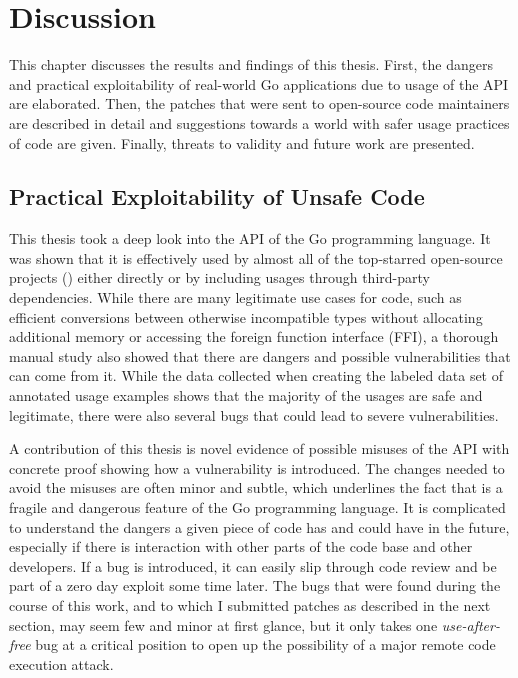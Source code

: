 
\chapter{Discussion}\label{ch:discussion}

This chapter discusses the results and findings of this thesis.
First, the dangers and practical exploitability of real-world Go applications due to usage of the \unsafe{} API are
elaborated.
Then, the patches that were sent to open-source code maintainers  are described in detail and suggestions towards a
world with safer usage practices of \unsafe{} code are given.
Finally, threats to validity and future work are presented.



\section{Practical Exploitability of Unsafe Code}\label{sec:discussion:exploitability}

This thesis took a deep look into the \unsafe{} API of the Go programming language.
It was shown that it is effectively used by almost all of the \projsAnalyzed{} top-starred open-source projects
(\percentageUnsafeTransitiveWithDependencies{}) either directly or by including \unsafe{} usages through third-party
dependencies.
While there are many legitimate use cases for \unsafe{} code, such as efficient conversions between otherwise
incompatible types without allocating additional memory or accessing the foreign function interface (\acrshort{FFI}),
a thorough manual study also showed that there are dangers and possible vulnerabilities that can come from it.
While the data collected when creating the labeled data set of annotated \unsafe{} usage examples shows that the
majority of the usages are safe and legitimate, there were also several bugs that could lead to severe vulnerabilities.

A contribution of this thesis is novel evidence of possible misuses of the \unsafe{} \acrshort{API} with concrete proof
showing how a vulnerability is introduced.
The changes needed to avoid the misuses are often minor and subtle, which underlines the fact that \unsafe{} is a
fragile and dangerous feature of the Go programming language.
It is complicated to understand the dangers a given piece of code has and could have in the future, especially if there
is interaction with other parts of the code base and other developers.
If a bug is introduced, it can easily slip through code review and be part of a zero day exploit some time later.
The bugs that were found during the course of this work, and to which I submitted patches as described in the next
section, may seem few and minor at first glance, but it only takes one \textit{use-after-free} bug at a critical
position to open up the possibility of a major remote code execution attack.

